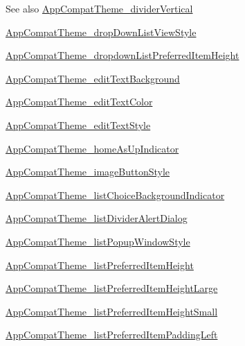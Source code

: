 \begin{DoxySeeAlso}{See also}
\hyperlink{classproject4_1_1xaria_1_1R_1_1styleable_a2fa98253e4b6f3756570cd37fb944000}{App\+Compat\+Theme\+\_\+divider\+Vertical} 

\hyperlink{classproject4_1_1xaria_1_1R_1_1styleable_ac0bd97fcf21ebf1428f0681d50718950}{App\+Compat\+Theme\+\_\+drop\+Down\+List\+View\+Style} 

\hyperlink{classproject4_1_1xaria_1_1R_1_1styleable_a6564d560cb7e73a0123ed899c3b6ad2e}{App\+Compat\+Theme\+\_\+dropdown\+List\+Preferred\+Item\+Height} 

\hyperlink{classproject4_1_1xaria_1_1R_1_1styleable_a197825ebee98f93494e82626ee54087e}{App\+Compat\+Theme\+\_\+edit\+Text\+Background} 

\hyperlink{classproject4_1_1xaria_1_1R_1_1styleable_a8fff9c294080610c2f55e32050dda6d5}{App\+Compat\+Theme\+\_\+edit\+Text\+Color} 

\hyperlink{classproject4_1_1xaria_1_1R_1_1styleable_a9d7977c472c0684d034633f96e9590ef}{App\+Compat\+Theme\+\_\+edit\+Text\+Style} 

\hyperlink{classproject4_1_1xaria_1_1R_1_1styleable_a9ff6722d4ca5847217d1afa321456b6e}{App\+Compat\+Theme\+\_\+home\+As\+Up\+Indicator} 

\hyperlink{classproject4_1_1xaria_1_1R_1_1styleable_a58cb61a783e430c03d51ecf0f3a7b145}{App\+Compat\+Theme\+\_\+image\+Button\+Style} 

\hyperlink{classproject4_1_1xaria_1_1R_1_1styleable_a3c9ed2db305731d7023349657b57ffe2}{App\+Compat\+Theme\+\_\+list\+Choice\+Background\+Indicator} 

\hyperlink{classproject4_1_1xaria_1_1R_1_1styleable_a736eb873329f632a3c8ce494223c9a1b}{App\+Compat\+Theme\+\_\+list\+Divider\+Alert\+Dialog} 

\hyperlink{classproject4_1_1xaria_1_1R_1_1styleable_a7a98332996662c01b4f98ddc8776aa86}{App\+Compat\+Theme\+\_\+list\+Popup\+Window\+Style} 

\hyperlink{classproject4_1_1xaria_1_1R_1_1styleable_a6f1d16f32d0ee16e2782714f155092ff}{App\+Compat\+Theme\+\_\+list\+Preferred\+Item\+Height} 

\hyperlink{classproject4_1_1xaria_1_1R_1_1styleable_a950e1a218f4b3586130f637e6ddfdcfb}{App\+Compat\+Theme\+\_\+list\+Preferred\+Item\+Height\+Large} 

\hyperlink{classproject4_1_1xaria_1_1R_1_1styleable_af5bdb2bf5ceb768d50348bb1dc8c469d}{App\+Compat\+Theme\+\_\+list\+Preferred\+Item\+Height\+Small} 

\hyperlink{classproject4_1_1xaria_1_1R_1_1styleable_aacb89a8e9a344b6bb4f794a6a33a8f1c}{App\+Compat\+Theme\+\_\+list\+Preferred\+Item\+Padding\+Left} 


\end{DoxySeeAlso}
